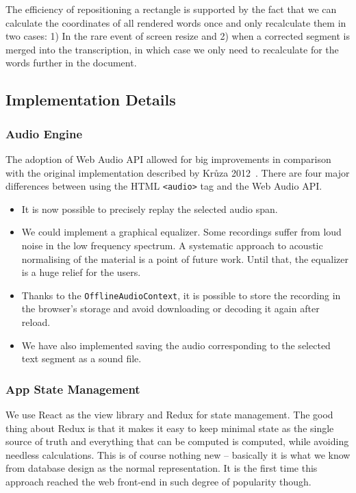 \documentclass{svproc}
\begin{document}
The efficiency of repositioning a rectangle is supported by the fact that we can
calculate the coordinates of all rendered words once and only recalculate them
in two cases: 1) In the rare event of screen resize and 2) when a corrected
segment is merged into the transcription, in which case we only need to
recalculate for the words further in the document.

\subsection{Implementation Details}

\subsubsection{Audio Engine}

The adoption of Web Audio API allowed for big improvements in comparison with
the original implementation described by Kr\r{u}za 2012~\cite{kruuza2012making}.
There are four major differences between using the HTML \texttt{<audio>} tag
and the Web Audio API.

\begin{itemize}
\item{It is now possible to precisely replay the selected audio span.}
\item{
    We could implement a graphical equalizer. Some recordings suffer from loud
    noise in the low frequency spectrum. A systematic approach to acoustic
    normalising of the material is a point of future work. Until that, the
    equalizer is a huge relief for the users.
}
\item{
    Thanks to the \texttt{OfflineAudioContext}, it is possible to store the
    recording in the browser's storage and avoid downloading or decoding it
    again after reload.
}
\item{
    We have also implemented saving the audio corresponding to the selected text
    segment as a sound file.
}
\end{itemize}

\subsubsection{App State Management}

We use React as the view library and Redux for state management. The good thing
about Redux is that it makes it easy to keep minimal state as the single source
of truth and everything that can be computed is computed, while avoiding
needless calculations. This is of course nothing new -- basically it is what we
know from database design as the normal representation. It is the first time
this approach reached the web front-end in such degree of popularity though.
\end{document}
